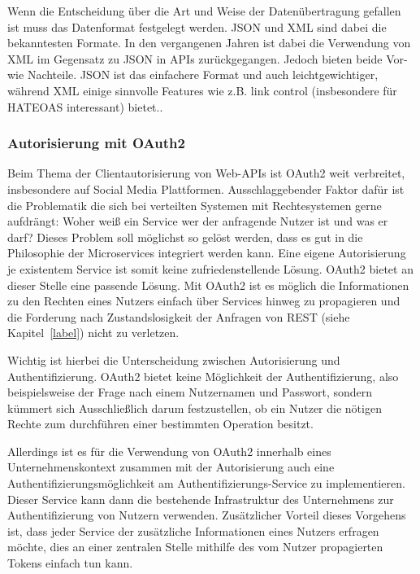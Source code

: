 \documentclass[12pt,a4paper,bibliography=totocnumbered,listof=totocnumbered]{scrartcl}
\begin{document}
Wenn die Entscheidung über die Art und Weise der Datenübertragung gefallen ist muss das Datenformat festgelegt werden. JSON und XML sind dabei die bekanntesten Formate. In den vergangenen Jahren ist dabei die Verwendung von XML im Gegensatz zu JSON in \acp{API} zurückgegangen\cite{duvander2}. Jedoch bieten beide Vor- wie Nachteile. JSON ist das einfachere Format und auch leichtgewichtiger, während XML einige sinnvolle Features wie z.B. link control (insbesondere für \ac{HATEOAS} interessant) bietet.\cite[S.101]{buildingms}.

\subsubsection{Autorisierung mit OAuth2}

Beim Thema der Clientautorisierung von Web-\acp{API} ist OAuth2 weit verbreitet, insbesondere auf Social Media Plattformen. Ausschlaggebender Faktor dafür ist die Problematik die sich bei verteilten Systemen mit Rechtesystemen gerne aufdrängt: Woher weiß ein Service wer der anfragende Nutzer ist und was er darf? Dieses Problem soll möglichst so gelöst werden, dass es gut in die Philosophie der Microservices integriert werden kann. Eine eigene Autorisierung je existentem Service ist somit keine zufriedenstellende Lösung. OAuth2 bietet an dieser Stelle eine passende Lösung. Mit OAuth2 ist es möglich die Informationen zu den Rechten eines Nutzers einfach über Services hinweg zu propagieren und die Forderung nach Zustandslosigkeit der Anfragen von REST (siehe Kapitel~\ref{label}) nicht zu verletzen.

Wichtig ist hierbei die Unterscheidung zwischen Autorisierung und Authentifizierung. OAuth2 bietet keine Möglichkeit der Authentifizierung, also beispielsweise der Frage nach einem Nutzernamen und Passwort, sondern kümmert sich Ausschließlich darum festzustellen, ob ein Nutzer die nötigen Rechte zum durchführen einer bestimmten Operation besitzt.\cite{degges}

\begin{sloppypar}
Allerdings ist es für die Verwendung von OAuth2 innerhalb eines Unternehmenskontext zusammen mit der Autorisierung auch eine Authentifizierungsmöglichkeit am Authentifizierungs-Service zu implementieren. Dieser Service kann dann die bestehende Infrastruktur des Unternehmens zur Authentifizierung von Nutzern verwenden. Zusätzlicher Vorteil dieses Vorgehens ist, dass jeder Service der zusätzliche Informationen eines Nutzers erfragen möchte, dies an einer zentralen Stelle mithilfe des vom Nutzer propagierten Tokens einfach tun kann.
\end{sloppypar}
\end{document}
